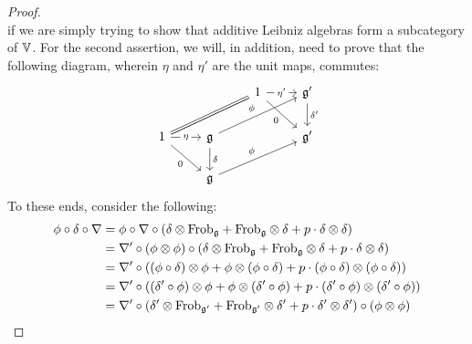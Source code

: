 \begin{proof}
$$                        $$
                    if we are simply trying to show that additive Leibniz algebras form a subcategory of $\V$. For the second assertion, we will, in addition, need to prove that the following diagram, wherein $\eta$ and $\eta'$ are the unit maps, commutes:
                        $$
                            \begin{tikzcd}
                            	&& {1} & {\g'} \\
                            	{1} & {\g} && {\g'} \\
                            	& {\g}
                            	\arrow["{\phi}", from=2-2, to=1-4]
                            	\arrow["{\phi}", from=3-2, to=2-4]
                            	\arrow["{\eta}" description, from=2-1, to=2-2]
                            	\arrow["{\delta}", from=2-2, to=3-2]
                            	\arrow["{\delta'}", from=1-4, to=2-4]
                            	\arrow["{\eta'}" description, from=1-3, to=1-4]
                            	\arrow[Rightarrow, from=2-1, to=1-3, no head]
                            	\arrow["{0}"', from=2-1, to=3-2]
                            	\arrow["{0}"', from=1-3, to=2-4]
                            \end{tikzcd}
                        $$
                    To these ends, consider the following:
                        $$
                            \begin{aligned}
                                \phi \circ \delta \circ \nabla & = \phi \circ \nabla \circ \left(\delta \tensor \Frob_{\g} + \Frob_{\g} \tensor \delta + p \cdot \delta \tensor \delta\right)
                                \\
                                & = \nabla' \circ (\phi \tensor \phi) \circ \left(\delta \tensor \Frob_{\g} + \Frob_{\g} \tensor \delta + p \cdot \delta \tensor \delta\right)
                                \\
                                & = \nabla' \circ \left((\phi \circ \delta) \tensor \phi + \phi \tensor (\phi \circ \delta) + p \cdot (\phi \circ \delta) \tensor (\phi \circ \delta)\right)
                                \\
                                & = \nabla' \circ \left((\delta' \circ \phi) \tensor \phi + \phi \tensor (\delta' \circ \phi) + p \cdot (\delta' \circ \phi) \tensor (\delta' \circ \phi)\right)
                                \\
                                & = \nabla' \circ \left(\delta' \tensor \Frob_{\g'} + \Frob_{\g'} \tensor \delta' + p \cdot \delta' \tensor \delta'\right) \circ (\phi \tensor \phi)

\end{aligned}$$
\end{proof}
